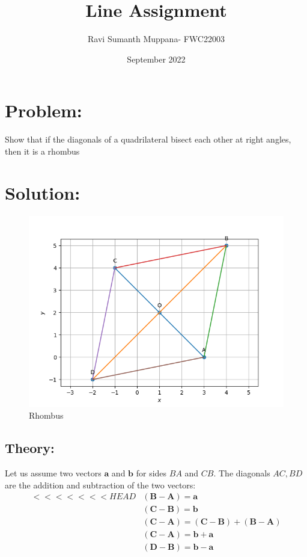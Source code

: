 \documentclass[a4paper,12pt,twocolumn]{article}
\title{Line Assignment}
\author{Ravi Sumanth Muppana- FWC22003}
\date{September 2022}
\let\vec\mathbf
\begin{document}
\maketitle
\section{Problem:}
Show that if the diagonals of a quadrilateral bisect each other at right angles, then it is a rhombus
\maketitle
\section{Solution:}
\begin{figure}[h]
	\includegraphics[width=\linewidth]{rhombus.png}
	\caption{Rhombus}
\end{figure}
\subsection{Theory:}
Let us assume two vectors $\vec{a}$ and $\vec{b}$ for sides $BA$ and $CB$. The diagonals $AC,BD$ are the addition and subtraction of the two vectors:
\begin{align}
<<<<<<< HEAD
	&\vec{(B-A)} = \vec{a}\\
	&\vec{(C-B)} = \vec{b}\\
	&\vec{(C-A)} = \vec{(C-B)} +\vec{(B-A)}\\
	&\vec{(C-A)} = \vec{b+a}\\
	&\vec{(D-B)} = \vec{b-a}\\
\end{align}
\end{document}
